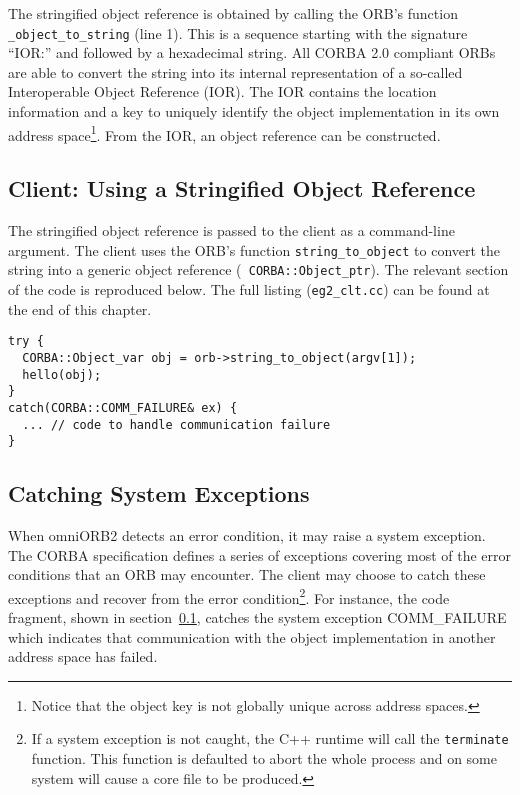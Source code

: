 \documentclass[11pt,twoside,onecolumn]{book}
\begin{document}
The stringified object reference is obtained by calling the ORB's function
{\tt \_object\_to\_string} (line 1). This is a sequence starting with the
signature ``IOR:'' and followed by a hexadecimal string. All CORBA 2.0
compliant ORBs are able to convert the string into its internal
representation of a so-called Interoperable Object Reference (IOR). The IOR
contains the location information and a key to uniquely identify the object
implementation in its own address space\footnote{Notice that the
object key is not globally unique across address spaces.}. From the IOR, an
object reference can be constructed.

\subsection{Client: Using a Stringified Object Reference}
\label{clnt2}

The stringified object reference is passed to the client as a command-line
argument. The client uses the ORB's function {\tt string\_to\_object} to
convert the string into a generic object reference ({\tt
CORBA::Object\_ptr}). The relevant section of the code is reproduced
below. The full listing ({\tt eg2\_clt.cc}) can be found at the end of this
chapter.

{\small
\begin{verbatim}
try {
  CORBA::Object_var obj = orb->string_to_object(argv[1]);
  hello(obj);
}
catch(CORBA::COMM_FAILURE& ex) {
  ... // code to handle communication failure
}
\end{verbatim}
}

\subsection{Catching System Exceptions}

When omniORB2 detects an error condition, it may raise a system exception.
The CORBA specification defines a series of exceptions covering most of the
error conditions that an ORB may encounter. The client may choose to catch
these exceptions and recover from the error condition\footnote{If a system
exception is not caught, the C++ runtime will call the {\tt terminate}
function. This function is defaulted to abort the whole process and on some
system will cause a core file to be produced.}. For instance, the code
fragment, shown in section~\ref{clnt2}, catches the system exception
COMM\_FAILURE which indicates that communication with the object
implementation in another address space has failed. 
\end{document}
